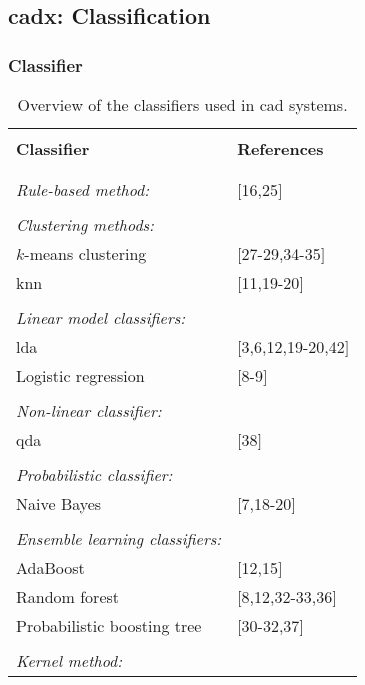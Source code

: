 \subsection{\ac{cadx}: Classification} \label{subsec:classification}

\subsubsection{Classifier}

\begin{table}
	\caption{Overview of the classifiers used in \ac{cad} systems.}
	\small
	\renewcommand{\arraystretch}{.8}
	\begin{tabular}{p{.60\linewidth} p{.30\linewidth}}
		\hline \\ [-1.5ex]
		\textbf{Classifier} & \textbf{References} \\ \\ [-1.5ex]
		\hline \\ [-1.5ex]
		\textit{Rule-based method:} & $[$16,25$]$ \\ \\ [-1.5ex]
		\textit{Clustering methods:} & \\
		\quad $k$-means clustering & $[$27-29,34-35$]$ \\
		\quad \acs{knn} & $[$11,19-20$]$ \\ \\ [-1.5ex]
		\textit{Linear model classifiers:} & \\
		\quad \acs{lda} & $[$3,6,12,19-20,42$]$ \\
		\quad Logistic regression & $[$8-9$]$ \\ \\ [-1.5ex]
		\textit{Non-linear classifier:} & \\
		\quad \acs{qda} & $[$38$]$ \\ \\ [-1.5ex]
		\textit{Probabilistic classifier:} & \\
		\quad Naive Bayes & $[$7,18-20$]$ \\ \\ [-1.5ex]
		\textit{Ensemble learning classifiers:} & \\
		\quad AdaBoost & $[$12,15$]$ \\
		\quad Random forest & $[$8,12,32-33,36$]$ \\
		\quad Probabilistic boosting tree & $[$30-32,37$]$ \\ \\ [-1.5ex]
		\textit{Kernel method:} & \\

\end{tabular}
\end{table}
